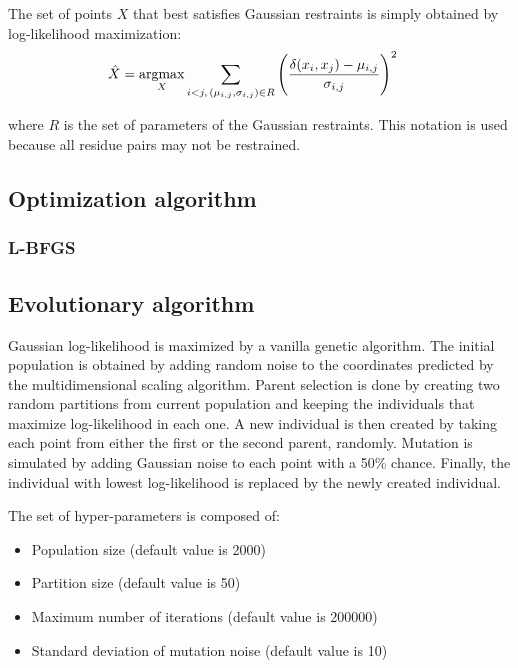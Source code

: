     The set of points $X$ that best satisfies Gaussian restraints is simply
    obtained by log-likelihood maximization:
    \begin{align}
        \hat{X} & = \operatorname*{argmax}_{X} \sum\limits_{i < j ,\, (\mu_{i,j}, \sigma_{i,j}) \in R}
            \Bigg(\frac{\delta(x_i, x_j) - \mu_{i,j}}{\sigma_{i,j}}\Bigg)^2
    \end{align}

    where $R$ is the set of parameters of the Gaussian restraints. This notation is used
    because all residue pairs may not be restrained.


  \subsection{Optimization algorithm}

    \subsubsection{L-BFGS}

      \todo{}

    \subsection{Evolutionary algorithm}

        Gaussian log-likelihood is maximized by a vanilla genetic algorithm.
        The initial population is obtained by adding random noise to the coordinates
        predicted by the multidimensional scaling algorithm.
        Parent selection is done by creating two random partitions from current population
        and keeping the individuals that maximize log-likelihood in each one.
        A new individual is then created by taking each point from either the first
        or the second parent, randomly. Mutation is simulated by adding Gaussian noise
        to each point with a 50\% chance.
        Finally, the individual with lowest log-likelihood is replaced by the
        newly created individual.

        The set of hyper-parameters is composed of:
        \begin{itemize}
            \item Population size (default value is 2000)
            \item Partition size (default value is 50)
            \item Maximum number of iterations (default value is 200000)
            \item Standard deviation of mutation noise (default value is 10)
        \end{itemize}

